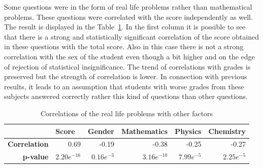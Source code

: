 Some questions were in the form of real life problems rather than mathematical problems. These questions were correlated with the score independently as well. The result is displayed in the Table~\ref{tab:corr2}. In the first column it is possible to see that there is a strong and statistically significant correlation of the score obtained in these questions with the total score. Also in this case there is not a strong correlation with the sex of the student even though a bit higher and on the edge of rejection of statistical insignificance. The trend of correlations with grades is preserved but the strength of correlation is lower. In connection with previous results, it leads to an assumption that students with worse grades from these subjects answered correctly rather this kind of questions than other questions.

\begin{table}[htbp]%
\caption{Correlations of the real life problems with other factors}
\label{tab:corr2}
\begin{center}
    \begin{tabular}{rrrrrr}
    \hline
    \multicolumn{1}{l}{\textbf{}} & \multicolumn{1}{l}{\textbf{Score}} & \multicolumn{1}{l}{\textbf{Gender}} & \multicolumn{1}{l}{\textbf{Mathematics}} & \multicolumn{1}{l}{\textbf{Physics}} & \multicolumn{1}{l}{\textbf{Chemistry}} \\
    \hline
    \textbf{Correlation}& 0.69  & -0.19  & -0.38  & -0.25  & -0.27  \\
		\textbf{p-value}& $2.20e^{-16}$   & $0.16e^{-3}$  & $3.16e^{-10}$  & $7.99e^{-5}$   & $2.25e^{-5}$   \\
    \hline
    \end{tabular}%
\end{center}
\end{table}
